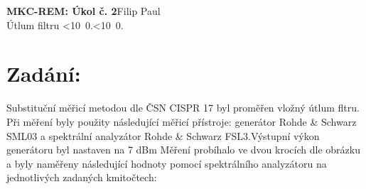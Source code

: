 \documentclass[10pt, a4paper]{article}%
\def\mydate{\leavevmode\hbox{\twodigits\day.\twodigits\month.\the\year}}
\def\twodigits#1{\ifnum#1<10 0\fi\the#1}
\begin{document}
\begin{flushleft}%
	\textbf{\Large{MKC-REM: Úkol č. 2}}\hfill Filip Paul\\
	\large{Útlum filtru \hfill\mydate}
\end{flushleft}
	\section*{\Large Zadání:}
	Substituční měřicí metodou dle ČSN CISPR 17 byl proměřen vložný útlum fltru. Při měření byly
	použity následující měřicí přístroje: generátor Rohde \& Schwarz SML03 a spektrální analyzátor
	Rohde \& Schwarz FSL3.Výstupní výkon generátoru byl nastaven na 7 dBm Měření probíhalo ve
	dvou krocích dle obrázku a byly naměřeny následující hodnoty pomocí spektrálního analyzátoru na
	jednotlivých zadaných kmitočtech:
\end{document}
